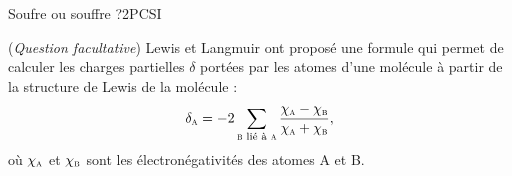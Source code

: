 \begin{exercise}{Soufre ou souffre ?}{2}{PCSI}
\begin{questions}
    
    \question (\emph{Question facultative}) Lewis et Langmuir ont proposé une formule qui permet de calculer les charges partielles $\delta$ portées par les atomes d’une molécule à partir de la structure de Lewis de la molécule :
    $$\delta_\textsc{a} = - 2 \sum_{\textsc{b} \text{ lié à } \textsc{a}} \dfrac{\chi_\textsc{a} - \chi_\textsc{b}}{\chi_\textsc{a} + \chi_\textsc{b}},$$
    où $\chi_\textsc{a}$ et $\chi_\textsc{b}$ sont les électronégativités des atomes A et B.


\end{questions}

\end{exercise}